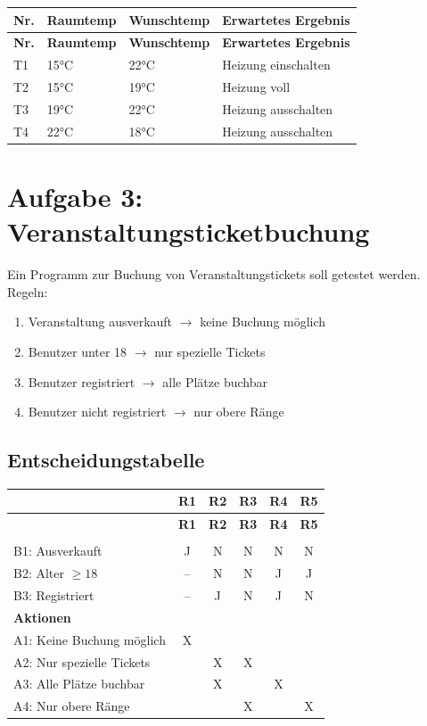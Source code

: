 \documentclass[
	fontsize=12pt,          %
	paper=a4,               %
	numbers=noenddot,       %
	listof=totoc,           %
	listof=entryprefix,     %
	listof=nochaptergap,    %
	bibliography=totoc,     %
	parskip=half,           %
	openany                 %
]{scrbook}
\begin{document}
\begin{longtable}{| p{0.5cm} | p{2.5cm} | p{2.5cm} | p{5.5cm} |}
	\hline
	\textbf{Nr.} & \textbf{Raumtemp} & \textbf{Wunschtemp} & \textbf{Erwartetes Ergebnis} \\ \hline
	\endfirsthead
	\hline
	\textbf{Nr.} & \textbf{Raumtemp} & \textbf{Wunschtemp} & \textbf{Erwartetes Ergebnis} \\ \hline
	\endhead
	\hline
	\endfoot
	T1 & 15°C & 22°C & Heizung einschalten \\ \hline
	T2 & 15°C & 19°C & Heizung voll \\ \hline
	T3 & 19°C & 22°C & Heizung ausschalten \\ \hline
	T4 & 22°C & 18°C & Heizung ausschalten \\ \hline
\end{longtable}


\chapter*{Aufgabe 3: Veranstaltungsticketbuchung}

Ein Programm zur Buchung von Veranstaltungstickets soll getestet werden.
Regeln:
\begin{enumerate}
	\item Veranstaltung ausverkauft $\rightarrow$ keine Buchung möglich
	\item Benutzer unter 18 $\rightarrow$ nur spezielle Tickets
	\item Benutzer registriert $\rightarrow$ alle Plätze buchbar
	\item Benutzer nicht registriert $\rightarrow$ nur obere Ränge
\end{enumerate}

\section*{Entscheidungstabelle}

\begin{longtable}{| p{4.5cm} | c | c | c | c | c |}
	\hline
	& \textbf{R1} & \textbf{R2} & \textbf{R3} & \textbf{R4} & \textbf{R5} \\ \hline
	\endfirsthead
	\hline
	& \textbf{R1} & \textbf{R2} & \textbf{R3} & \textbf{R4} & \textbf{R5} \\ \hline
	\endhead
	\hline
	\endfoot
	\multicolumn{6}{|l|}{\textbf{Bedingungen}} \\ \hline
	B1: Ausverkauft & J & N & N & N & N \\ \hline
	B2: Alter $\geq 18$ & -- & N & N & J & J \\ \hline
	B3: Registriert & -- & J & N & J & N \\ \hline
	\multicolumn{6}{|l|}{\textbf{Aktionen}} \\ \hline
	A1: Keine Buchung möglich & X & & & & \\ \hline
	A2: Nur spezielle Tickets & & X & X & & \\ \hline
	A3: Alle Plätze buchbar & & X & & X & \\ \hline
	A4: Nur obere Ränge & & & X & & X \\ \hline
\end{longtable}
\end{document}
